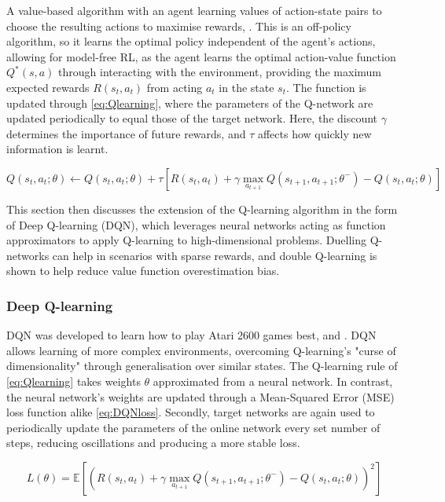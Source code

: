 A value-based algorithm with an agent learning values of action-state pairs to choose the resulting actions to maximise rewards, \cite{watkins1992q}. This is an off-policy algorithm, so it learns the optimal policy independent of the agent's actions, allowing for model-free RL, as the agent learns the optimal action-value function \(Q^*(s, a)\) through interacting with the environment, providing the maximum expected rewards \(R(s_t, a_t)\) from acting \(a_t\) in the state \(s_t\). The function is updated through \autoref{eq:Qlearning}, where the parameters of the Q-network are updated periodically to equal those of the target network. Here, the discount $\gamma$ determines the importance of future rewards, and $\tau$ affects how quickly new information is learnt.


\begin{equation}
    Q(s_t, a_t; \theta) \leftarrow Q(s_t, a_t; \theta) + \tau [ R(s_t, a_t) + \gamma \max_{a_{t+1}} Q(s_{t+1}, a_{t+1}; \theta^{-}) - Q(s_t, a_t; \theta)]
\label{eq:Qlearning}
\end{equation}

This section then discusses the extension of the Q-learning algorithm in the form of Deep Q-learning (DQN), which leverages neural networks acting as function approximators to apply Q-learning to high-dimensional problems. Duelling Q-networks can help in scenarios with sparse rewards, and double Q-learning is shown to help reduce value function overestimation bias.

\subsubsection{Deep Q-learning}
\label{sec:DQN}

DQN was developed to learn how to play Atari 2600 games best, \cite{mnih2015human} and \cite{mnih2013playing}. DQN allows learning of more complex environments, overcoming Q-learning's "curse of dimensionality" through generalisation over similar states. The Q-learning rule of \autoref{eq:Qlearning} takes weights \(\theta\) approximated from a neural network. In contrast, the neural network's weights are updated through a Mean-Squared Error (MSE) loss function alike \autoref{eq:DQNloss}. Secondly, target networks are again used to periodically update the parameters of the online network every set number of steps, reducing oscillations and producing a more stable loss.

\begin{equation}
    L(\theta) = \mathbb{E} [ ( R(s_t, a_t) + \gamma \max_{a_{t+1}} Q(s_{t+1}, a_{t+1}; \theta^{-}) - Q(s_t, a_t; \theta) )^2]
\label{eq:DQNloss}
\end{equation}


